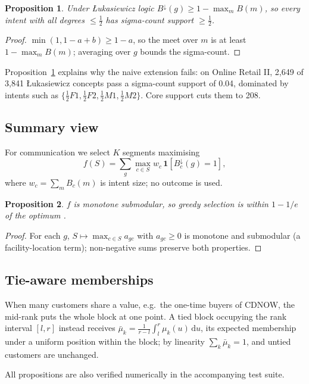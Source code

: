 \documentclass[conference]{IEEEtran}
\newtheorem{proposition}{Proposition}
\begin{document}
\begin{proposition}\label{prop:floor}
Under Łukasiewicz logic $B^{\downarrow}(g)\ge1-\max_m B(m)$, so every intent with all degrees $\le\tfrac12$ has sigma-count support $\ge\tfrac12$.
\end{proposition}
\begin{proof}
$\min(1,1-a+b)\ge1-a$, so the meet over $m$ is at least $1-\max_m B(m)$; averaging over $g$ bounds the sigma-count.
\end{proof}

Proposition~\ref{prop:floor} explains why the naive extension fails: on Online Retail II, 2,649 of 3,841 Łukasiewicz concepts pass a sigma-count support of 0.04, dominated by intents such as $\{\tfrac12F1,\tfrac12F2,\tfrac12M1,\tfrac12M2\}$. Core support cuts them to 208.

\subsection{Summary view}
For communication we select $K$ segments maximising
\begin{equation}
f(S)=\textstyle\sum_{g}\max_{c\in S} w_c\,\mathbf{1}[B_c^{\downarrow}(g)=1],
\end{equation}
where $w_c=\sum_m B_c(m)$ is intent size; no outcome is used.

\begin{proposition}\label{prop:greedy}
$f$ is monotone submodular, so greedy selection is within $1-1/e$ of the optimum \cite{nemhauser1978}.
\end{proposition}
\begin{proof}
For each $g$, $S\mapsto\max_{c\in S}a_{gc}$ with $a_{gc}\ge0$ is monotone and submodular (a facility-location term); non-negative sums preserve both properties.
\end{proof}

\subsection{Tie-aware memberships}
When many customers share a value, e.g.\ the one-time buyers of CDNOW, the mid-rank puts the whole block at one point. A tied block occupying the rank interval $[l,r]$ instead receives $\bar\mu_k=\frac{1}{r-l}\int_l^r\mu_k(u)\,\mathrm{d}u$, its expected membership under a uniform position within the block; by linearity $\sum_k\bar\mu_k=1$, and untied customers are unchanged.

All propositions are also verified numerically in the accompanying test suite.
\end{document}
